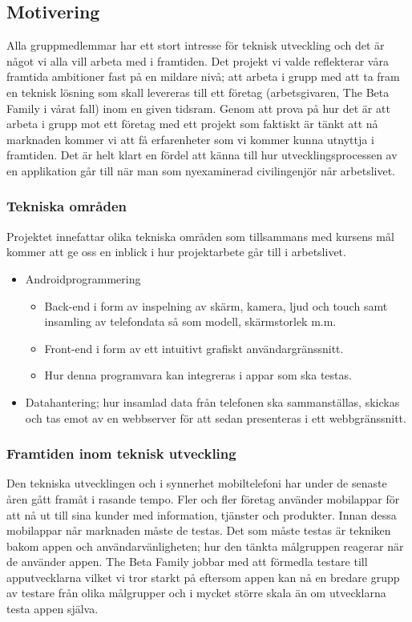\subsection{Motivering}
Alla gruppmedlemmar har ett stort intresse för teknisk utveckling och det är något vi alla vill arbeta med i framtiden. Det projekt vi valde reflekterar våra framtida ambitioner fast på en mildare nivå; att arbeta i grupp med att ta fram en teknisk lösning som skall levereras till ett företag (arbetsgivaren, The Beta Family i vårat fall) inom en given tidsram. Genom att prova på hur det är att arbeta i grupp mot ett företag med ett projekt som faktiskt är tänkt att nå marknaden kommer vi att få erfarenheter som vi kommer kunna utnyttja i framtiden. Det är helt klart en fördel att känna till hur utvecklingsprocessen av en applikation går till när man som nyexaminerad civilingenjör når arbetslivet.

\subsubsection{Tekniska områden}

Projektet innefattar olika tekniska områden som tillsammans med kursens mål kommer att ge oss en inblick i hur projektarbete går till i arbetslivet. 
\begin{itemize}
	\item Androidprogrammering
	\begin{itemize}
		\item Back-end i form av inspelning av skärm, kamera, ljud och touch samt insamling av telefondata så som modell, skärmstorlek m.m.
		\item Front-end i form av ett intuitivt grafiskt användargränssnitt.
		\item Hur denna programvara kan integreras i appar som ska testas.
	\end{itemize}
	\item Datahantering; hur insamlad data från telefonen ska sammanställas, skickas och tas emot av en webbserver för att sedan presenteras i ett webbgränssnitt.
\end{itemize}

\subsubsection{Framtiden inom teknisk utveckling}
Den tekniska utvecklingen och i synnerhet mobiltelefoni har under de senaste åren gått framåt i rasande tempo. Fler och fler företag använder mobilappar för att nå ut till sina kunder med information, tjänster och produkter. Innan dessa mobilappar når marknaden måste de testas. Det som måste testas är tekniken bakom appen och användarvänligheten; hur den tänkta målgruppen reagerar när de använder appen. The Beta Family jobbar med att förmedla testare till apputvecklarna vilket vi tror starkt på eftersom appen kan nå en bredare grupp av testare från olika målgrupper och i mycket större skala än om utvecklarna testa appen själva.
